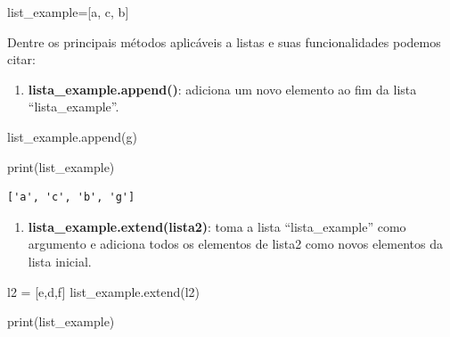 \documentclass[
  brazilian,
  letterpaper,
  DIV=11,
  numbers=noendperiod]{scrreprt}
\newenvironment{Shaded}{\begin{snugshade}}{\end{snugshade}}
\newcommand{\BuiltInTok}[1]{\textcolor[rgb]{0.00,0.23,0.31}{#1}}
\newcommand{\NormalTok}[1]{\textcolor[rgb]{0.00,0.23,0.31}{#1}}
\newcommand{\OperatorTok}[1]{\textcolor[rgb]{0.37,0.37,0.37}{#1}}
\newcommand{\StringTok}[1]{\textcolor[rgb]{0.13,0.47,0.30}{#1}}
\providecommand{\tightlist}{%
  \setlength{\itemsep}{0pt}\setlength{\parskip}{0pt}}
\begin{document}
\begin{Shaded}
\begin{Highlighting}[]
\NormalTok{list\_example}\OperatorTok{=}\NormalTok{[}\StringTok{\textquotesingle{}a\textquotesingle{}}\NormalTok{, }\StringTok{\textquotesingle{}c\textquotesingle{}}\NormalTok{, }\StringTok{\textquotesingle{}b\textquotesingle{}}\NormalTok{]}
\end{Highlighting}
\end{Shaded}

Dentre os principais métodos aplicáveis a listas e suas funcionalidades
podemos citar:

\begin{enumerate}
\def\labelenumi{\arabic{enumi}.}
\tightlist
\item
  \textbf{lista\_example.append()}: adiciona um novo elemento ao fim da
  lista ``lista\_example''.
\end{enumerate}

\begin{Shaded}
\begin{Highlighting}[]
\NormalTok{list\_example.append(}\StringTok{\textquotesingle{}g\textquotesingle{}}\NormalTok{)}

\BuiltInTok{print}\NormalTok{(list\_example)}
\end{Highlighting}
\end{Shaded}

\begin{verbatim}
['a', 'c', 'b', 'g']
\end{verbatim}

\begin{enumerate}
\def\labelenumi{\arabic{enumi}.}
\setcounter{enumi}{1}
\tightlist
\item
  \textbf{lista\_example.extend(lista2)}: toma a lista
  ``lista\_example'' como argumento e adiciona todos os elementos de
  lista2 como novos elementos da lista inicial.
\end{enumerate}

\begin{Shaded}
\begin{Highlighting}[]
\NormalTok{l2 }\OperatorTok{=}\NormalTok{ [}\StringTok{\textquotesingle{}e\textquotesingle{}}\NormalTok{,}\StringTok{\textquotesingle{}d\textquotesingle{}}\NormalTok{,}\StringTok{\textquotesingle{}f\textquotesingle{}}\NormalTok{]}
\NormalTok{list\_example.extend(l2)}

\BuiltInTok{print}\NormalTok{(list\_example)}
\end{Highlighting}
\end{Shaded}
\end{document}
